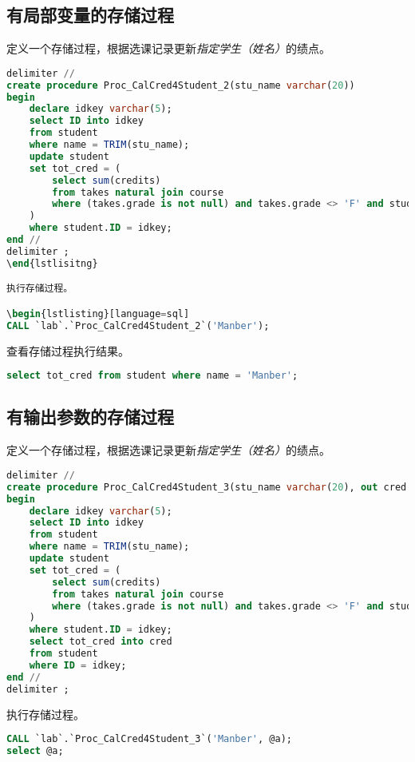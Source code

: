 \documentclass{article}
\begin{document}
\subsection{有局部变量的存储过程}

定义一个存储过程，根据选课记录更新\emph{指定学生（姓名）}的绩点。

\begin{lstlisting}[language=sql]
delimiter //
create procedure Proc_CalCred4Student_2(stu_name varchar(20))
begin
	declare idkey varchar(5);
    select ID into idkey
    from student
    where name = TRIM(stu_name);
	update student
    set tot_cred = (
		select sum(credits)
        from takes natural join course
        where (takes.grade is not null) and takes.grade <> 'F' and student.ID = takes.ID
    )
    where student.ID = idkey;
end //
delimiter ;
\end{lstlisitng}

执行存储过程。

\begin{lstlisting}[language=sql]
CALL `lab`.`Proc_CalCred4Student_2`('Manber');
\end{lstlisting}

查看存储过程执行结果。

\begin{lstlisting}[language=sql]
select tot_cred from student where name = 'Manber';
\end{lstlisting}

\subsection{有输出参数的存储过程}

定义一个存储过程，根据选课记录更新\emph{指定学生（姓名）}的绩点。

\begin{lstlisting}[language=sql]
delimiter //
create procedure Proc_CalCred4Student_3(stu_name varchar(20), out cred decimal(3,0))
begin
	declare idkey varchar(5);
    select ID into idkey
    from student
    where name = TRIM(stu_name);
	update student
    set tot_cred = (
		select sum(credits)
        from takes natural join course
        where (takes.grade is not null) and takes.grade <> 'F' and student.ID = takes.ID
    )
    where student.ID = idkey;
    select tot_cred into cred
    from student
    where ID = idkey;
end //
delimiter ;
\end{lstlisting}

执行存储过程。

\begin{lstlisting}[language=sql]
CALL `lab`.`Proc_CalCred4Student_3`('Manber', @a);
select @a;
\end{lstlisting}
\end{document}
